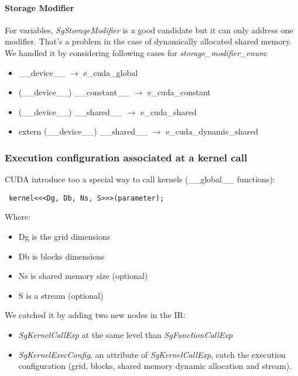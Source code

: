 				\paragraph{Storage Modifier}	

For variables, \emph{SgStorageModifier} is a good candidate but it can only address one modifier. That's a problem in the case of dynamically allocated shared memory.
We handled it by considering following cases for \emph{storage\_modifier\_enum}:
		
\begin{itemize}
	\item \_\_device\_\_ $\rightarrow$ e\_cuda\_global
	\item (\_\_device\_\_) \_\_constant\_\_ $\rightarrow$ e\_cuda\_constant
	\item (\_\_device\_\_) \_\_shared\_\_ $\rightarrow$ e\_cuda\_shared
	\item extern (\_\_device\_\_) \_\_shared\_\_ $\rightarrow$ e\_cuda\_dynamic\_shared
\end{itemize}

			\subsubsection{Execution configuration associated at a kernel call}

CUDA introduce too a special way to call kernels (\_\_global\_\_ functions):
\begin{verbatim} kernel<<<Dg, Db, Ns, S>>>(parameter); \end{verbatim}
Where:
\begin{itemize}
	\item Dg is the grid dimensions
	\item Db is blocks dimensions
	\item Ns is shared memory size (optional)
	\item S is a stream (optional)
\end{itemize}
We catched it by adding two new nodes in the IR: 
\begin{itemize}
	\item \emph{SgKernelCallExp} at the same level than \emph{SgFunctionCallExp}
	\item \emph{SgKernelExecConfig}, an attribute of \emph{SgKernelCallExp}, catch the execution configuration (grid, blocks, shared memory dynamic allocation and stream).
\end{itemize}

